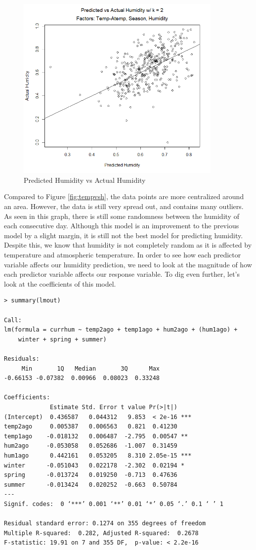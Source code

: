 \documentclass[12pt]{article}
\begin{document}
\begin{figure} [H]
	\centering
  	\includegraphics[width=100mm]{T-ATvsH.png}
 	\caption{Predicted Humidity vs Actual Humidity}
 	\label{fig:t-at}
\end{figure}

Compared to Figure \ref{fig:tempvsh}, the data points are more centralized around an area. However, the data is still very spread out, and contains many outliers. As seen in this graph, there is still some randomness between the humidity of each consecutive day. Although this model is an improvement to the previous model by a slight margin, it is still not the best model for predicting humidity. Despite this, we know that humidity is not completely random as it is affected by temperature and atmospheric temperature. In order to see how each predictor variable affects our humidity prediction, we need to look at the magnitude of how each predictor variable affects our response variable. To dig  even further, let's look at the coefficients of this model.

\begin{verbatim}
> summary(lmout)

Call:
lm(formula = currhum ~ temp2ago + temp1ago + hum2ago + (hum1ago) + 
    winter + spring + summer)

Residuals:
     Min       1Q   Median       3Q      Max 
-0.66153 -0.07382  0.00966  0.08023  0.33248 

Coefficients:
             Estimate Std. Error t value Pr(>|t|)    
(Intercept)  0.436587   0.044312   9.853  < 2e-16 ***
temp2ago     0.005387   0.006563   0.821  0.41230    
temp1ago    -0.018132   0.006487  -2.795  0.00547 ** 
hum2ago     -0.053058   0.052686  -1.007  0.31459    
hum1ago      0.442161   0.053205   8.310 2.05e-15 ***
winter      -0.051043   0.022178  -2.302  0.02194 *  
spring      -0.013724   0.019250  -0.713  0.47636    
summer      -0.013424   0.020252  -0.663  0.50784    
---
Signif. codes:  0 ‘***’ 0.001 ‘**’ 0.01 ‘*’ 0.05 ‘.’ 0.1 ‘ ’ 1

Residual standard error: 0.1274 on 355 degrees of freedom
Multiple R-squared:  0.282,	Adjusted R-squared:  0.2678 
F-statistic: 19.91 on 7 and 355 DF,  p-value: < 2.2e-16
\end{verbatim}
\end{document}
